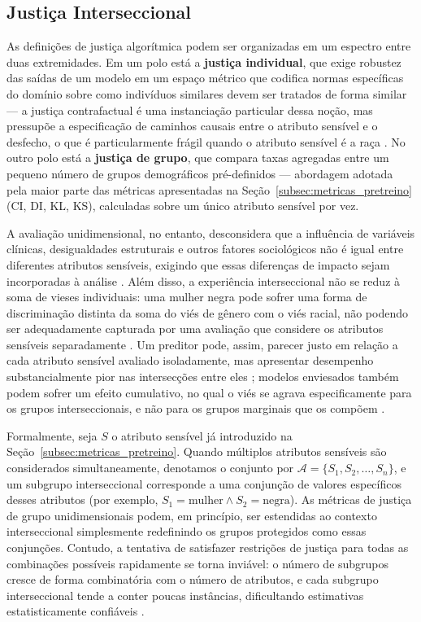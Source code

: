 \subsection{Justiça Interseccional}\label{subsec:justica_interseccional}

As definições de justiça algorítmica podem ser organizadas em um espectro entre duas extremidades. Em um polo está a \textbf{justiça individual}, que exige robustez das saídas de um modelo em um espaço métrico que codifica normas específicas do domínio sobre como indivíduos similares devem ser tratados de forma similar — a justiça contrafactual é uma instanciação particular dessa noção, mas pressupõe a especificação de caminhos causais entre o atributo sensível e o desfecho, o que é particularmente frágil quando o atributo sensível é a raça \cite{pfohl2021empirical}. No outro polo está a \textbf{justiça de grupo}, que compara taxas agregadas entre um pequeno número de grupos demográficos pré-definidos — abordagem adotada pela maior parte das métricas apresentadas na Seção~\ref{subsec:metricas_pretreino} (CI, DI, KL, KS), calculadas sobre um único atributo sensível por vez.

A avaliação unidimensional, no entanto, desconsidera que a influência de variáveis clínicas, desigualdades estruturais e outros fatores sociológicos não é igual entre diferentes atributos sensíveis, exigindo que essas diferenças de impacto sejam incorporadas à análise \cite{pfohl2021empirical,bailey2017structural,hanna2020towards,sewell2016racism,vanderweele2014causal}. Além disso, a experiência interseccional não se reduz à soma de vieses individuais: uma mulher negra pode sofrer uma forma de discriminação distinta da soma do viés de gênero com o viés racial, não podendo ser adequadamente capturada por uma avaliação que considere os atributos sensíveis separadamente \cite{crenshaw2022demarginalizing}. Um preditor pode, assim, parecer justo em relação a cada atributo sensível avaliado isoladamente, mas apresentar desempenho substancialmente pior nas intersecções entre eles \cite{buolamwini2018gender}; modelos enviesados também podem sofrer um efeito cumulativo, no qual o viés se agrava especificamente para os grupos interseccionais, e não para os grupos marginais que os compõem \cite{seyyed2021underdiagnosis}.

Formalmente, seja $S$ o atributo sensível já introduzido na Seção~\ref{subsec:metricas_pretreino}. Quando múltiplos atributos sensíveis são considerados simultaneamente, denotamos o conjunto por $\mathcal{A} = \{S_1, S_2, \ldots, S_n\}$, e um subgrupo interseccional corresponde a uma conjunção de valores específicos desses atributos (por exemplo, $S_1 = \text{mulher} \wedge S_2 = \text{negra}$). As métricas de justiça de grupo unidimensionais podem, em princípio, ser estendidas ao contexto interseccional simplesmente redefinindo os grupos protegidos como essas conjunções. Contudo, a tentativa de satisfazer restrições de justiça para todas as combinações possíveis rapidamente se torna inviável: o número de subgrupos cresce de forma combinatória com o número de atributos, e cada subgrupo interseccional tende a conter poucas instâncias, dificultando estimativas estatisticamente confiáveis \cite{kearns2018preventing}.


